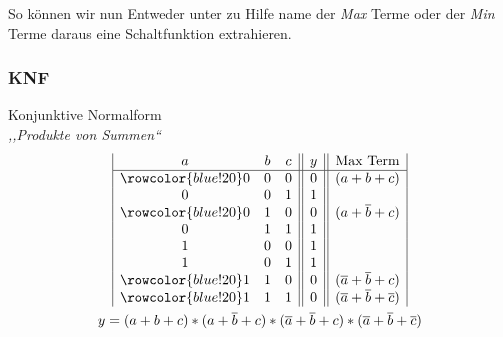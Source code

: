 \documentclass{article}
\begin{document}
So können wir nun Entweder unter zu Hilfe name der \emph{Max} Terme oder der \emph{Min} Terme daraus eine Schaltfunktion extrahieren.


\noindent\begin{minipage}[b]{.45\linewidth}
    \subsubsection{KNF}
    Konjunktive Normalform \\
    \emph{,,Produkte von Summen``}
    \begin{gather*}
        \begin{array}{|c c c || c || c |}
            a & b & c & y  & \text{Max Term} \\
            \hline 
            \rowcolor{blue!20} 0 & 0 & 0 & 0 & (a+b+c)  \\
            0 & 0 & 1 & 1   & \\
            \rowcolor{blue!20} 0 & 1 & 0 & 0 & (a+\overline{b}+c)  \\
            0 & 1 & 1 & 1 & \\
            1 & 0 & 0 & 1 & \\ 
            1 & 0& 1 & 1  & \\ 
            \rowcolor{blue!20}  1 & 1 & 0 & 0 & (\overline{a}+\overline{b}+c) \\
            \rowcolor{blue!20}  1 & 1 & 1 &  0 & (\overline{a}+\overline{b}+\overline{c}) \\
        \end{array} \\
        y=(a+b+c)*(a+\overline{b}+c)* (\overline{a}+\overline{b}+c) *  (\overline{a}+\overline{b}+\overline{c})
        \end{gather*}
\end{minipage} \begin{minipage}{.50\linewidth}

\end{minipage}
\end{document}
